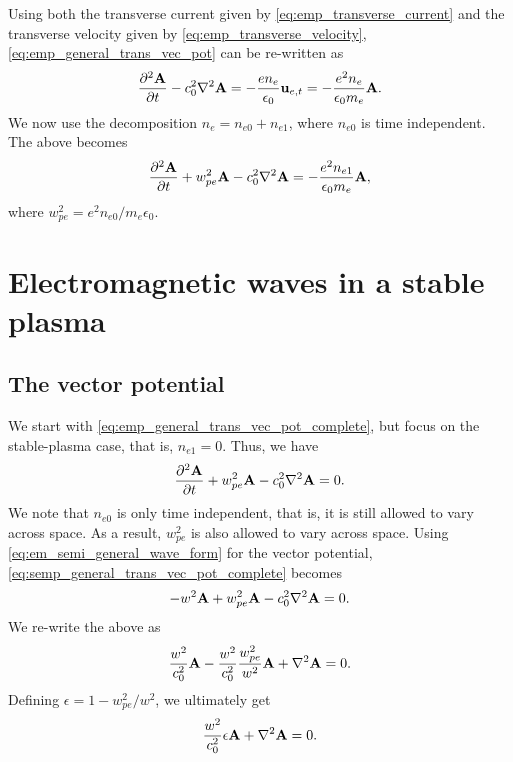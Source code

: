 \documentclass[a4paper,11pt]{report}
\begin{document}
Using both the transverse current given by \cref{eq:emp_transverse_current} and the transverse velocity given by \cref{eq:emp_transverse_velocity}, \cref{eq:emp_general_trans_vec_pot} can be re-written as
\begin{equation*}
    \frac{\partial^2 \mathbf{A}}{\partial t} - c_0^2 \nabla^2 \mathbf{A} = -\frac{e n_e}{\epsilon_0} \mathbf{u}_{e,t} = -\frac{e^2 n_e}{\epsilon_0 m_e} \mathbf{A}.
\end{equation*}
We now use the decomposition $n_e = n_{e0} + n_{e1}$, where $n_{e0}$ is time independent. The above becomes
\begin{equation}
    \label{eq:emp_general_trans_vec_pot_complete}
    \frac{\partial^2 \mathbf{A}}{\partial t} + w_{pe}^2 \mathbf{A} - c_0^2 \nabla^2 \mathbf{A} = -\frac{e^2 n_{e1}}{\epsilon_0 m_e} \mathbf{A},
\end{equation}
where $w_{pe}^2 = e^2 n_{e0} / m_e \epsilon_0$.

\chapter{Electromagnetic waves in a stable plasma}
\section{The vector potential}
\label{sec:semp_vector_potential}
We start with \cref{eq:emp_general_trans_vec_pot_complete}, but focus on the stable-plasma case, that is, $n_{e1} = 0$. Thus, we have
\begin{equation}
    \label{eq:semp_general_trans_vec_pot_complete}
    \frac{\partial^2 \mathbf{A}}{\partial t} + w_{pe}^2 \mathbf{A} - c_0^2 \nabla^2 \mathbf{A} = 0.
\end{equation}
We note that $n_{e0}$ is only time independent, that is, it is still allowed to vary across space. As a result, $w_{pe}^2$ is also allowed to vary across space. Using \cref{eq:em_semi_general_wave_form} for the vector potential, \cref{eq:semp_general_trans_vec_pot_complete} becomes
\begin{equation*}
    -w^2 \mathbf{A} + w_{pe}^2 \mathbf{A} - c_0^2 \nabla^2 \mathbf{A} = 0.
\end{equation*}
We re-write the above as
\begin{equation*}
    \frac{w^2}{c_0^2} \mathbf{A} - \frac{w^2}{c_0^2} \frac{w_{pe}^2}{w^2} \mathbf{A} + \nabla^2 \mathbf{A} = 0.
\end{equation*}
Defining $\epsilon = 1 - w_{pe}^2 / w^2$, we ultimately get
\begin{equation}
    \label{eq:semp_general_trans_vec_pot_complete_spec}
    \frac{w^2}{c_0^2} \epsilon \mathbf{A} + \nabla^2 \mathbf{A} = 0.
\end{equation}
\end{document}
